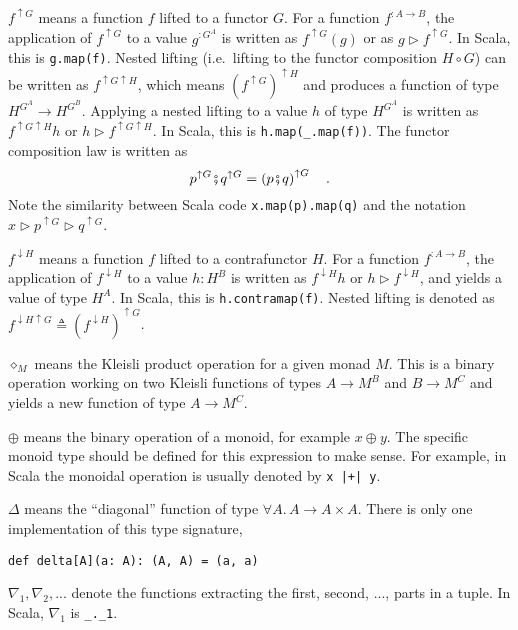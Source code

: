 $f^{\uparrow G}$ means a function $f$ lifted to a functor $G$.
For a function $f^{:A\rightarrow B}$, the application of $f^{\uparrow G}$
to a value $g^{:G^{A}}$ is written as $f^{\uparrow G}(g)$ or as
$g\triangleright f^{\uparrow G}$. In Scala, this is \lstinline!g.map(f)!.
Nested lifting (i.e.~lifting to the functor composition $H\circ G$)
can be written as $f^{\uparrow G\uparrow H}$, which means $\left(f^{\uparrow G}\right)^{\uparrow H}$
and produces a function of type $H^{G^{A}}\rightarrow H^{G^{B}}$.
Applying a nested lifting to a value $h$ of type $H^{G^{A}}$ is
written as $f^{\uparrow G\uparrow H}h$ or $h\triangleright f^{\uparrow G\uparrow H}$.
In Scala, this is \lstinline!h.map(_.map(f))!. The functor composition
law is written as
\[
p^{\uparrow G}\bef q^{\uparrow G}=\left(p\bef q\right)^{\uparrow G}\quad.
\]
Note the similarity between Scala code \lstinline!x.map(p).map(q)!
and the notation $x\triangleright p^{\uparrow G}\triangleright q^{\uparrow G}$.

$f^{\downarrow H}$ means a function $f$ lifted to a contrafunctor
$H$. For a function $f^{:A\rightarrow B}$, the application of $f^{\downarrow H}$
to a value $h:H^{B}$ is written as $f^{\downarrow H}h$ or $h\triangleright f^{\downarrow H}$,
and yields a value of type $H^{A}$. In Scala, this is \lstinline!h.contramap(f)!.
Nested lifting is denoted as $f^{\downarrow H\uparrow G}\triangleq(f^{\downarrow H})^{\uparrow G}$.

$\diamond_{M}$ means the Kleisli product operation for a given monad
$M$. This is a binary operation working on two Kleisli functions
of types $A\rightarrow M^{B}$ and $B\rightarrow M^{C}$ and yields
a new function of type $A\rightarrow M^{C}$.

$\oplus$ means the binary operation of a monoid, for example $x\oplus y$.
The specific monoid type should be defined for this expression to
make sense. For example, in Scala the monoidal operation is usually
denoted by \lstinline!x |+| y!.

$\Delta$ means the ``diagonal'' function of type $\forall A.\,A\rightarrow A\times A$.
There is only one implementation of this type signature,
\begin{lstlisting}
def delta[A](a: A): (A, A) = (a, a)
\end{lstlisting}

$\nabla_{1},\nabla_{2},...$ denote the functions extracting the first,
second, ..., parts in a tuple. In Scala, $\nabla_{1}$ is \lstinline!_._1!.


